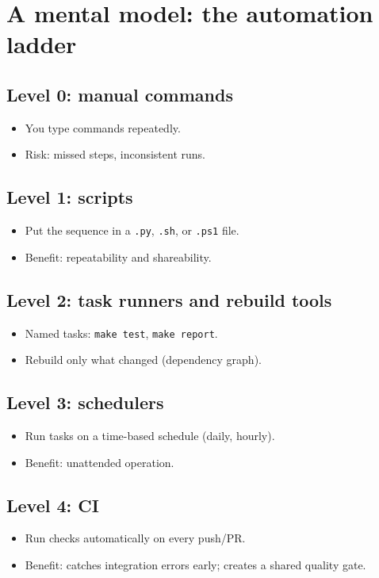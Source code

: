 \section{A mental model: the automation ladder}
\subsection{Level 0: manual commands}
\begin{itemize}
\item You type commands repeatedly.
\item Risk: missed steps, inconsistent runs.
\end{itemize}

\subsection{Level 1: scripts}
\begin{itemize}
\item Put the sequence in a \texttt{.py}, \texttt{.sh}, or \texttt{.ps1} file.
\item Benefit: repeatability and shareability.
\end{itemize}

\subsection{Level 2: task runners and rebuild tools}
\begin{itemize}
\item Named tasks: \texttt{make test}, \texttt{make report}.
\item Rebuild only what changed (dependency graph).
\end{itemize}

\subsection{Level 3: schedulers}
\begin{itemize}
\item Run tasks on a time-based schedule (daily, hourly).
\item Benefit: unattended operation.
\end{itemize}

\subsection{Level 4: CI}
\begin{itemize}
\item Run checks automatically on every push/PR.
\item Benefit: catches integration errors early; creates a shared quality gate.
\end{itemize}

